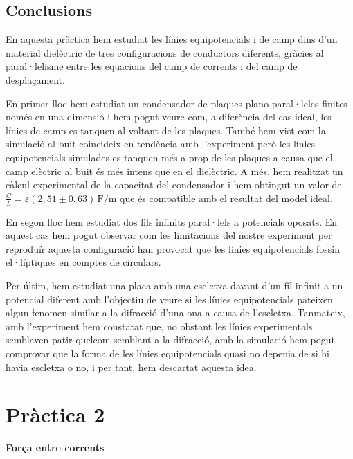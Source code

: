 \documentclass[11pt]{article}
\numberwithin{equation}{section}
\numberwithin{figure}{section}
\numberwithin{table}{section}
\begin{document}
\subsection{Conclusions}\label{sec: conc}

En aquesta pràctica hem estudiat les línies equipotencials i de camp dins d'un material dielèctric de tres configuracions de conductors diferents, gràcies al paral·lelisme entre les equacions del camp de corrents i del camp de desplaçament. 

En primer lloc hem estudiat un condensador de plaques plano-paral·leles finites només en una dimensió i hem pogut veure com, a diferència del cas ideal, les línies de camp es tanquen al voltant de les plaques. També hem vist com la simulació al buit coincideix en tendència amb l'experiment però les línies equipotencials simulades es tanquen més a prop de les plaques a causa que el camp elèctric al buit és més intens que en el dielèctric. A més, hem realitzat un càlcul experimental de la capacitat del condensador i hem obtingut un valor de $ \frac{C}{L} = \varepsilon  (2{,}51 \pm 0{,}63)\, \mathrm{F/m} $ que és compatible amb el resultat del model ideal.

En segon lloc hem estudiat dos fils infinits paral·lels a potencials oposats. En aquest cas hem pogut observar com les limitacions del nostre experiment per reproduïr aquesta configuració han provocat que les línies equipotencials fossin el·líptiques en comptes de circulars.

Per últim, hem estudiat una placa amb una escletxa davant d'un fil infinit a un potencial diferent amb l'objectiu de veure si les línies equipotencials pateixen algun fenomen similar a la difracció d'una ona a causa de l'escletxa. Tanmateix, amb l'experiment hem constatat que, no obstant les línies experimentals semblaven patir quelcom semblant a la difracció, amb la simulació hem pogut comprovar que la forma de les línies equipotencials quasi no depenia de si hi havia escletxa o no, i per tant, hem descartat aquesta idea.

\newpage
\section{\huge \textbf{Pràctica 2}}

{}  %

\vspace{0.5em}  %

{\Huge \textbf{Força entre corrents}}  %
\end{document}
